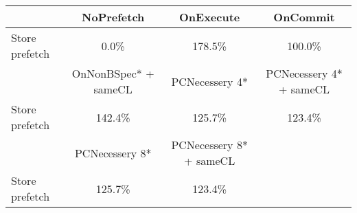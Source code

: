 \begin{tabular}{ l|ccc }
 & NoPrefetch & OnExecute & OnCommit\\ \hline
Store prefetch & 0.0\% & 178.5\% & 100.0\%\\ \hline
\hline
 & OnNonBSpec* + sameCL & PCNecessery 4* & PCNecessery 4* + sameCL\\ \hline
Store prefetch & 142.4\% & 125.7\% & 123.4\%\\ \hline
\hline
 & PCNecessery 8* & PCNecessery 8* + sameCL&\\ \hline
Store prefetch & 125.7\% & 123.4\%&\\ \hline
\end{tabular}

